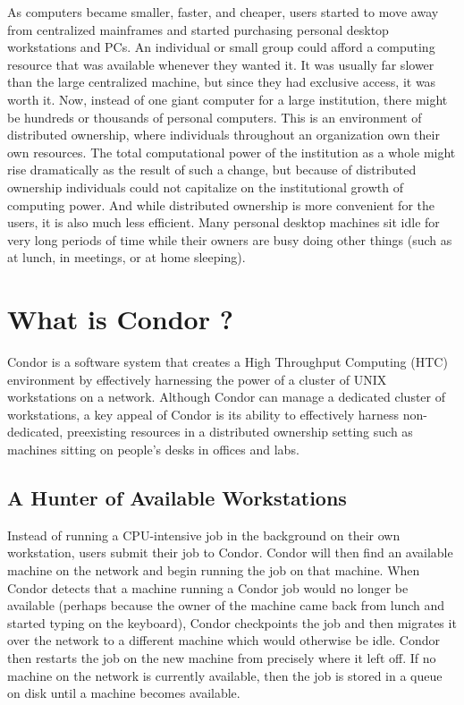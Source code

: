As computers became smaller, faster, and cheaper, users started to move
away from centralized mainframes and started purchasing personal desktop
workstations and PCs. An individual or small group could afford a
computing resource that was available whenever they wanted it. It was
usually far slower than the large centralized machine, but since they
had exclusive access, it was worth it. Now, instead of one giant
computer for a large institution, there might be hundreds or thousands
of personal computers. This is an environment of distributed ownership,
where individuals throughout an organization own their own resources.
The total computational power of the institution as a whole might rise
dramatically as the result of such a change, but because of distributed
ownership individuals could not capitalize on the institutional growth of
computing power. And while distributed ownership is more convenient for
the users, it is also much less efficient. Many personal desktop
machines sit idle for very long periods of time while their owners are
busy doing other things (such as at lunch, in meetings, or at home
sleeping). 

\section{\label{sec:what-is-condor}What is Condor ?}

Condor is a software system that creates a High Throughput Computing
(HTC) environment by effectively harnessing the power of a cluster of
UNIX workstations on a network. Although Condor can manage a dedicated
cluster of workstations, a key appeal of Condor is its ability to
effectively harness non-dedicated, preexisting resources in a
distributed ownership setting such as machines sitting on people's desks
in offices and labs. 

\subsection{A Hunter of Available Workstations}

Instead of running a CPU-intensive job in the background on their own
workstation, users submit their job to Condor. Condor will then find an
available machine on the network and begin running the job on
that machine. When Condor detects that a machine running a Condor job
would no longer be available (perhaps because the owner of the machine
came back from lunch and started typing on the keyboard), Condor
checkpoints the job and then migrates it over the network to a
different machine which would otherwise be idle. Condor then restarts
the job on the new machine from precisely where it left off. If no
machine on the network is currently available, then the job is stored in
a queue on disk until a machine becomes available.


